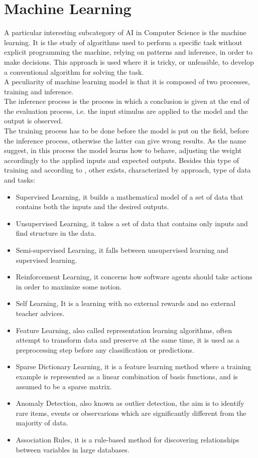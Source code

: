 \section{Machine Learning}
A particular interesting subcategory of AI in Computer Science is the machine learning. It is the study of algorithms used to perform a specific task without explicit programming the machine, relying on patterns and inference, in order to make decisions. This approach is used where it is tricky, or unfeasible, to develop a conventional algorithm for solving the task.\\

A peculiarity of machine learning model is that it is composed of two processes, training and inference.\\
The inference process is the process in which a conclusion is given at the end of the evaluation process, i.e. the input stimulus are applied to the model and the output is observed.\\
The training process has to be done before the model is put on the field, before the inference process, otherwise the latter can give wrong results. As the name suggest, in this process the model learns how to behave, adjusting the weight accordingly to the applied inputs and expected outputs. Besides this type of training and according to \cite{book:1}, other exists, characterized by approach, type of data and tasks:
\begin{itemize}
\item Supervised Learning, it builds a mathematical model of a set of data that contains both the inputs and the desired outputs.
\item Unsupervised Learning, it takes a set of data that contains only inputs and find structure in the data.
\item Semi-supervised Learning, it falls between unsupervised learning and supervised learning.
\item Reinforcement Learning, it concerns how software agents should take actions in order to maximize some notion.
\item Self Learning, It is a learning with no external rewards and no external teacher advices.
\item Feature Learning, also called representation learning algorithms, often attempt to transform data and preserve at the same time, it is used as a preprocessing step before any classification or predictions.
\item Sparse Dictionary Learning, it is a feature learning method where a training example is represented as a linear combination of basis functions, and is assumed to be a sparse matrix.
\item Anomaly Detection, also known as outlier detection, 
the aim is to identify rare items, events or observarions which are significantly different from the majority of data.
\item Association Rules, it is a rule-based method for discovering relationships between variables in large databases.
\end{itemize}

